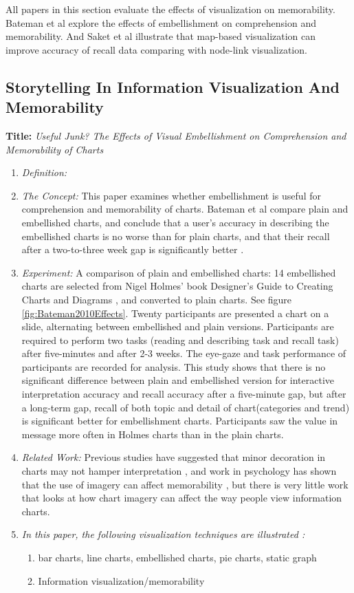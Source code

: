 \documentclass{egpubl}
\begin{document}
All papers in this section evaluate the effects of visualization on memorability. Bateman et al \cite{bateman} explore the effects of embellishment on comprehension and memorability. And Saket et al \cite{saket2015} illustrate that map-based visualization can improve accuracy of recall data comparing with node-link visualization.


\subsection{Storytelling In Information Visualization And Memorability}
\textbf{Title:} \textit{Useful Junk? The Effects of Visual Embellishment on Comprehension and Memorability of Charts}
\begin{enumerate}
\item \textit{Definition:} 
\item \textit{The Concept:} This paper examines whether embellishment is useful for comprehension and memorability of charts. Bateman et al compare plain and embellished charts, and conclude that a user's accuracy in describing the embellished charts is no worse than for plain charts, and that their recall after a two-to-three week gap is significantly better \cite{bateman}. 
\item \textit{Experiment:} A comparison of plain and embellished charts: 14 embellished charts are selected from Nigel Holmes' book Designer's Guide to Creating 
Charts and Diagrams \cite{holmes}, and converted to plain charts. See figure \ref{fig:Bateman2010Effects}. Twenty participants are presented a chart on a slide, alternating between embellished and plain versions. Participants are required to perform two tasks (reading and describing task and recall task) after five-minutes and after 2-3 weeks. The eye-gaze and task performance of participants are recorded for analysis. This study shows that there is no significant difference between plain and embellished version for interactive interpretation accuracy and recall accuracy after a five-minute gap,
but after a long-term gap, recall of both topic and detail of chart(categories and trend) is significant better for embellishment charts. Participants saw the value in message more often in Holmes charts than in the plain charts.

\item \textit{Related Work:}  Previous studies have suggested that minor decoration in charts may not hamper interpretation \cite{Blasio}, and work in psychology has shown that the use of imagery can affect memorability \cite{gambrell}, but there is very little work that looks at how chart imagery can affect the way people view information charts. 
\item \textit{In this paper, the following visualization techniques are illustrated :} 
\begin{enumerate}
\item bar charts, line charts, embellished charts, pie charts, static graph
\item Information visualization/memorability
\end{enumerate}
\end{enumerate}
\end{document}
